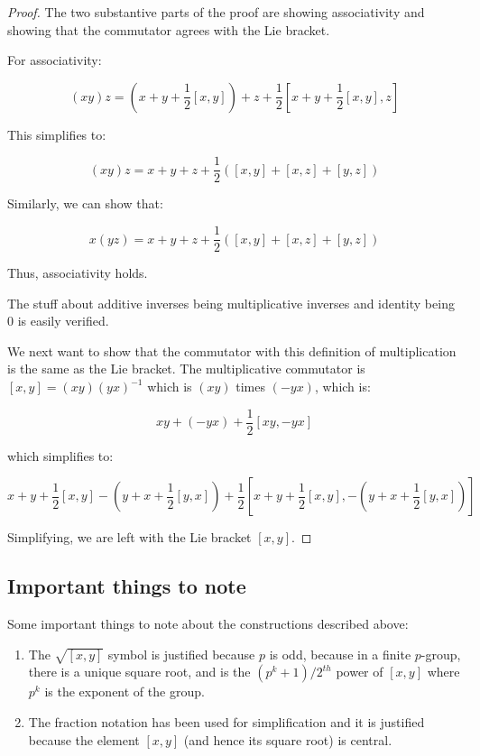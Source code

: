 \documentclass[10pt]{amsart}
\begin{document}
\begin{proof}
  The two substantive parts of the proof are showing associativity and
  showing that the commutator agrees with the Lie bracket.

  For associativity:

  $$(xy)z = \left(x + y + \frac{1}{2}[x,y]\right) + z + \frac{1}{2}\left[x + y + \frac{1}{2}[x,y],z\right]$$

  This simplifies to:

  $$(xy)z = x + y + z + \frac{1}{2}\left([x,y] + [x,z] + [y,z]\right)$$

  Similarly, we can show that:

  $$x(yz) = x + y + z + \frac{1}{2}\left([x,y] + [x,z] + [y,z]\right)$$

  Thus, associativity holds.

  The stuff about additive inverses being multiplicative inverses and
  identity being $0$ is easily verified.

  We next want to show that the commutator with this definition of
  multiplication is the same as the Lie bracket. The multiplicative
  commutator is $[x,y] = (xy)(yx)^{-1}$ which is $(xy)$ times $(-yx)$,
  which is:

  $$xy + (-yx) + \frac{1}{2}[xy,-yx]$$

  which simplifies to:

  $$x + y + \frac{1}{2}[x,y] - (y + x + \frac{1}{2}[y,x]) + \frac{1}{2}[x + y + \frac{1}{2}[x,y],-(y + x + \frac{1}{2}[y,x])]$$

  Simplifying, we are left with the Lie bracket $[x,y]$.
\end{proof}
\subsection{Important things to note}

Some important things to note about the constructions described above:

\begin{enumerate}
\item The $\sqrt{[x,y]}$ symbol is justified because $p$ is odd,
  because in a finite $p$-group, there is a unique square root, and is
  the $(p^k+1)/2^{th}$ power of $[x,y]$ where $p^k$ is the exponent of
  the group.
\item The fraction notation has been used for simplification and it is
  justified because the element $[x,y]$ (and hence its square root) is
  central.
\end{enumerate}
\end{document}
